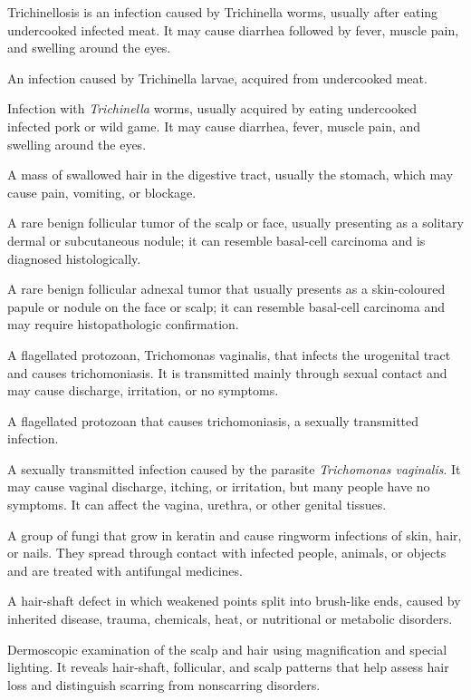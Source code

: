  Trichinellosis is an infection caused by Trichinella worms, usually after eating undercooked infected meat. It may cause diarrhea followed by fever, muscle pain, and swelling around the eyes.

 An infection caused by Trichinella larvae, acquired from undercooked meat.

 Infection with \textit{Trichinella} worms, usually acquired by eating undercooked infected pork or wild game. It may cause diarrhea, fever, muscle pain, and swelling around the eyes.

 A mass of swallowed hair in the digestive tract, usually the stomach, which may cause pain, vomiting, or blockage.

 A rare benign follicular tumor of the scalp or face, usually presenting as a solitary dermal or subcutaneous nodule; it can resemble basal-cell carcinoma and is diagnosed histologically.

 A rare benign follicular adnexal tumor that usually presents as a skin-coloured papule or nodule on the face or scalp; it can resemble basal-cell carcinoma and may require histopathologic confirmation.

 A flagellated protozoan, Trichomonas vaginalis, that infects the urogenital tract and causes trichomoniasis.
It is transmitted mainly through sexual contact and may cause discharge, irritation, or no
symptoms.

 A flagellated protozoan that causes trichomoniasis, a sexually transmitted infection.

 A sexually transmitted infection caused by the parasite \textit{Trichomonas vaginalis}. It may cause vaginal discharge, itching, or irritation, but many people have no symptoms. It can affect the vagina, urethra, or other genital tissues.

 A group of fungi that grow in keratin and cause ringworm infections of skin, hair, or nails. They spread through contact with infected people, animals, or objects and are treated with antifungal medicines.

 A hair-shaft defect in which weakened points split into brush-like ends, caused by inherited disease, trauma, chemicals, heat, or nutritional or metabolic disorders.

 Dermoscopic examination of the scalp and hair using magnification and special lighting. It
reveals hair-shaft, follicular, and scalp patterns that help assess hair loss and
distinguish scarring from nonscarring disorders.

